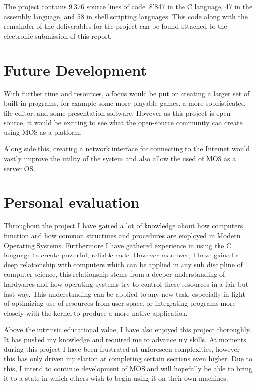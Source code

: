 \documentclass[a4paper]{report}
\begin{document}
The project contains 9'376 source lines of code; 8'847 in the C language, 47 in the assembly language, and 58 in shell scripting languages. This code along with the remainder of the deliverables for the project can be found attached to the electronic submission of this report.

\section{Future Development}

With further time and resources, a focus would be put on creating a larger set of built-in programs, for example some more playable games, a more sophisticated file editor, and some presentation software. However as this project is open source, it would be exciting to see what the open-source community can create using MOS as a platform.

Along side this, creating a network interface for connecting to the Internet would vastly improve the utility of the system and also allow the used of MOS as a server OS.


\section{Personal evaluation}

Throughout the project I have gained a lot of knowledge about how computers function and how common structures and procedures are employed in Modern Operating Systems. Furthermore I have gathered experience in using the C language to create powerful, reliable code. However moreover, I have gained a deep relationship with computers which can be applied in any sub discipline of computer science, this relationship stems from a deeper understanding of hardwares and how operating systems try to control these resources in a fair but fast way. This understanding can be applied to any new task, especially in light of optimizing use of resources from user-space, or integrating programs more closely with the kernel to produce a more native application.

Above the intrinsic educational value, I have also enjoyed this project thoroughly. It has pushed my knowledge and required me to advance my skills. At moments during this project I have been frustrated at unforeseen complexities, however this has only driven my elation at completing certain sections even higher. Due to this, I intend to continue development of MOS and will hopefully be able to bring it to a state in which others wish to begin using it on their own machines.
\end{document}
